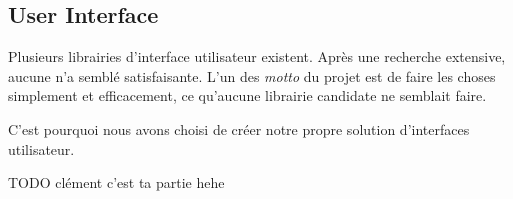 \subsection{User Interface}
    Plusieurs librairies d'interface utilisateur existent. Après une recherche extensive, aucune n'a semblé satisfaisante. L'un des \textit{motto} du projet est de faire les choses simplement et efficacement, ce qu'aucune librairie candidate ne semblait faire.

    C'est pourquoi nous avons choisi de créer notre propre solution d'interfaces utilisateur.

    TODO clément c'est ta partie hehe